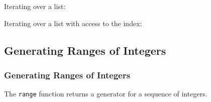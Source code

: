{\begin{frame}
    \vspace{6mm}
    Iterating over a list:
    \vspace{3mm}
    \contentForI
    \pause
    
    \vspace{6mm}
    Iterating over a list with access to the index:
    \vspace{3mm}
    \contentForII
\end{frame}

\subsection{Generating Ranges of Integers}
\begin{frame}
    \frametitle{Generating Ranges of Integers}
    \vspace{3mm}
    The \texttt{range} function returns a generator for a sequence of integers.
    \pause
    \vspace{3mm}
    \contentRange
\end{frame}

}


